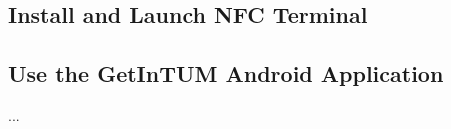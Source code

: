 \subsection{Install and Launch NFC Terminal}

%
%
%
%
%


\subsection{Use the GetInTUM Android Application}

...



\iffalse
\bigskip
\begin{lstlisting}
# npm install -g bower
# npm install -g grunt-cli
# npm install -g vows		(optional; runs unit tests)
$ npm install
\end{lstlisting}
\bigskip

\fi